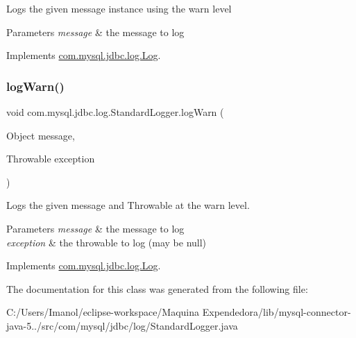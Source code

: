 Logs the given message instance using the \textquotesingle{}warn\textquotesingle{} level


\begin{DoxyParams}{Parameters}
{\em message} & the message to log \\
\hline
\end{DoxyParams}


Implements \mbox{\hyperlink{interfacecom_1_1mysql_1_1jdbc_1_1log_1_1_log_aa37a430b8cd7d66bb3ff46cb87e060f3}{com.\+mysql.\+jdbc.\+log.\+Log}}.

\mbox{\label{classcom_1_1mysql_1_1jdbc_1_1log_1_1_standard_logger_a53736a9dbaa1f110722baee2ca70020c}} 
\subsubsection{\texorpdfstring{log\+Warn()}{logWarn()}\hspace{0.1cm}{\footnotesize\ttfamily [2/2]}}
{\footnotesize\ttfamily void com.\+mysql.\+jdbc.\+log.\+Standard\+Logger.\+log\+Warn (\begin{DoxyParamCaption}\item[{Object}]{message,  }\item[{Throwable}]{exception }\end{DoxyParamCaption})}

Logs the given message and Throwable at the \textquotesingle{}warn\textquotesingle{} level.


\begin{DoxyParams}{Parameters}
{\em message} & the message to log \\
\hline
{\em exception} & the throwable to log (may be null) \\
\hline
\end{DoxyParams}


Implements \mbox{\hyperlink{interfacecom_1_1mysql_1_1jdbc_1_1log_1_1_log_a04d875e95d9a1d35f305da5ca20219a3}{com.\+mysql.\+jdbc.\+log.\+Log}}.



The documentation for this class was generated from the following file\+:\begin{DoxyCompactItemize}
\item 
C\+:/\+Users/\+Imanol/eclipse-\/workspace/\+Maquina Expendedora/lib/mysql-\/connector-\/java-\/5../src/com/mysql/jdbc/log/Standard\+Logger.\+java\end{DoxyCompactItemize}

